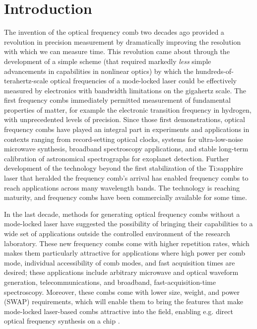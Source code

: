  \chapter{Introduction}
\label{ch:intro}

The invention of the optical frequency comb two decades ago provided a revolution in precision measurement by dramatically improving the resolution with which we can measure time. This revolution came about through the development of a simple scheme (that required markedly \textit{less} simple advancements in capabilities in nonlinear optics) by which the hundreds-of-terahertz-scale optical frequencies of a mode-locked laser could be effectively measured by electronics with bandwidth limitations on the gigahertz scale. The first frequency combs immediately permitted measurement of fundamental properties of matter, for example the electronic transition frequency in hydrogen, with unprecedented levels of precision. Since those first demonstrations, optical frequency combs have played an integral part in experiments and applications in contexts ranging from record-setting optical clocks, systems for ultra-low-noise microwave synthesis, broadband spectroscopy applications, and stable long-term calibration of astronomical spectrographs for exoplanet detection. Further development of the technology beyond the first stabilization of the Ti:sapphire laser that heralded the frequency comb's arrival has enabled frequency combs to reach applications across many wavelength bands. The technology is reaching maturity, and frequency combs have been commercially available for some time.

In the last decade, methods for generating optical frequency combs without a mode-locked laser have suggested the possibility of bringing their capabilities to a wide set of applications outside the controlled environment of the research laboratory. These new frequency combs come with higher repetition rates, which makes them particularly attractive for applications where high power per comb mode, individual accessibility of comb modes, and fast acquisition times are desired; these applications include arbitrary microwave and optical waveform generation, telecommunications, and broadband, fast-acquisition-time spectroscopy. Moreover, these combs come with lower size, weight, and power (SWAP) requirements, which will enable them to bring the features that make mode-locked laser-based combs attractive into the field, enabling e.g. direct optical frequency synthesis on a chip \cite{Spencer2018}.


